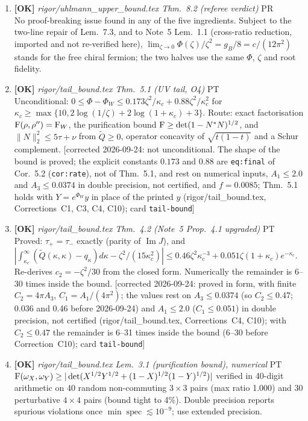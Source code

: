\documentclass[11pt]{article}
\begin{document}
\begin{enumerate}[leftmargin=1.6em,itemsep=6pt]
\item \textbf{[OK]} \emph{rigor/uhlmann\_upper\_bound.tex Thm.~8.2 (referee verdict)} \hfill\textsc{PR}\\ No proof-breaking issue found in any of the five ingredients. Subject to the two-line repair of Lem.~7.3, and to Note~5 Lem.~1.1 (cross-ratio reduction, imported and not re-verified here), \(\lim_{\zeta\to0}\Phi(\zeta)/\zeta^2=g_B/8=c/(12\pi^2)\) stands for the free chiral fermion; the two halves use the same \(\Phi\), \(\zeta\) and root fidelity.
\item \textbf{[OK]} \emph{rigor/tail\_bound.tex Thm.~5.1 (UV tail, O4)} \hfill\textsc{PT}\\ Unconditional: \(0\le\Phi-\Phi_W\le0.173\zeta^2/\kappa_c+0.88\zeta^2/\kappa_c^2\) for \(\kappa_c\ge\max\{10,2\log(1/\zeta)+2\log(1+\kappa_c)+3\}\). Route: exact factorisation \(\operatorname{F}(\rho,\rho'')=\operatorname{F}_W\), the purification bound \(\operatorname{F}\ge\det(1-N^*N)^{1/2}\), and \(\|N\|_2^2\le5\tau+\nu\) from \(\widetilde Q\ge0\), operator concavity of \(\sqrt{t(1-t)}\) and a Schur complement. [corrected 2026-09-24: not unconditional. The shape of the bound is proved; the explicit constants \(0.173\) and \(0.88\) are \texttt{eq:final} of Cor.~5.2 (\texttt{cor:rate}), not of Thm.~5.1, and rest on numerical inputs, \(A_1\le2.0\) and \(A_3\le0.0374\) in double precision, not certified, and \(f=0.0085\); Thm.~5.1 holds with \(Y=e^{\Phi_W}y\) in place of the printed \(y\) (rigor/tail\_bound.tex, Corrections~C1, C3, C4, C10); card \texttt{tail-bound}]
\item \textbf{[OK]} \emph{rigor/tail\_bound.tex Thm.~4.2 (Note~5 Prop.~4.1 upgraded)} \hfill\textsc{PT}\\ Proved: \(\tau_+=\tau_-\) exactly (parity of \(\operatorname{Im}J\)), and \(|\int_{\kappa_c}^\infty(\widetilde Q(\kappa,\kappa)-q_\kappa)d\kappa-\zeta^2/(15\kappa_c^2)|\le0.46\zeta^2\kappa_c^{-3}+0.051\zeta(1+\kappa_c)e^{-\kappa_c}\). Re-derives \(c_2=-\zeta^2/30\) from the closed form. Numerically the remainder is 6--30 times inside the bound. [corrected 2026-09-24: proved in form, with finite \(C_2=4\pi A_3\), \(C_1=A_1/(4\pi^2)\); the values rest on \(A_3\le0.0374\) (so \(C_2\le0.47\); 0.036 and 0.46 before 2026-09-24) and \(A_1\le2.0\) (\(C_1\le0.051\)) in double precision, not certified (rigor/tail\_bound.tex, Corrections~C4, C10); with \(C_2\le0.47\) the remainder is 6--31 times inside the bound (6--30 before Correction~C10); card \texttt{tail-bound}]
\item \textbf{[OK]} \emph{rigor/tail\_bound.tex Lem.~3.1 (purification bound), numerical} \hfill\textsc{PT}\\ \(\operatorname{F}(\omega_X,\omega_Y)\ge|\det(X^{1/2}Y^{1/2}+(1-X)^{1/2}(1-Y)^{1/2})|\) verified in 40-digit arithmetic on 40 random non-commuting \(3\times3\) pairs (max ratio 1.000) and 30 perturbative \(4\times4\) pairs (bound tight to 4\%). Double precision reports spurious violations once \(\min\operatorname{spec}\lesssim10^{-9}\); use extended precision.

\end{enumerate}
\end{document}
